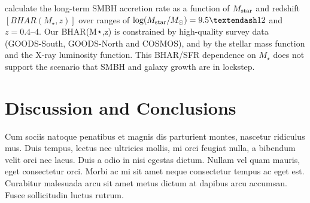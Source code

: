 \documentclass[usenatbib]{mnras}
\begin{document}
\citet{YangG2018} calculate the long-term SMBH accretion rate as a function of 
$M_{\rm star}$ and redshift $[BHAR(M_{\star} ,z)]$ 
over ranges of 
$\log (M_{\rm star} / M_{\odot}) = 9.5–12$ and $z = 0.4–4$. 
Our BHAR(M⋆,z) is constrained by high-quality survey data (GOODS-South, GOODS-North and COSMOS), and by the stellar mass function and the X-ray luminosity function.
 This BHAR/SFR dependence on $M_{\star}$ does not support the scenario that SMBH and galaxy growth are in lockstep.


\section{Discussion and Conclusions}
\label{sec:conclusions}
Cum sociis natoque penatibus et magnis dis parturient montes, nascetur
ridiculus mus. Duis tempus, lectus nec ultricies mollis, mi orci
feugiat nulla, a bibendum velit orci nec lacus. Duis a odio in nisi
egestas dictum. Nullam vel quam mauris, eget consectetur orci. Morbi
ac mi sit amet neque consectetur tempus ac eget est. Curabitur
malesuada arcu sit amet metus dictum at dapibus arcu accumsan. Fusce
sollicitudin luctus rutrum.
\end{document}
